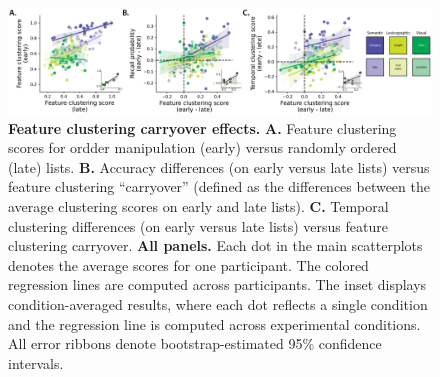 \documentclass[11pt]{article}
\begin{document}
\begin{figure}[tp] \centering
    \includegraphics[width=\textwidth]{figures/clustering_carryover}
    
    \caption{\textbf{Feature clustering carryover effects.} \textbf{A.} Feature
    clustering scores for ordder manipulation (early) versus randomly ordered
    (late) lists. \textbf{B.} Accuracy differences (on early versus late lists)
    versus feature clustering ``carryover'' (defined as the differences between
    the average clustering scores on early and late lists). \textbf{C.}
    Temporal clustering differences (on early versus late lists) versus feature
    clustering carryover. \textbf{All panels.} Each dot in the main
    scatterplots denotes the average scores for one participant. The colored
    regression lines are computed across participants. The inset displays
    condition-averaged results, where each dot reflects a single condition and
    the regression line is computed across experimental conditions. All error
    ribbons denote bootstrap-estimated 95\% confidence intervals.}
    \label{fig:clustering-carryover} 

\end{figure}
\end{document}
